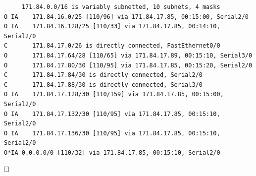 \documentclass[11pt]{article}
\begin{document}
\begin{enumerate}
\begin{mdframed}
\begin{verbatim}
     171.84.0.0/16 is variably subnetted, 10 subnets, 4 masks
O IA    171.84.16.0/25 [110/96] via 171.84.17.85, 00:15:00, Serial2/0
O IA    171.84.16.128/25 [110/33] via 171.84.17.85, 00:14:10, Serial2/0
C       171.84.17.0/26 is directly connected, FastEthernet0/0
O       171.84.17.64/28 [110/65] via 171.84.17.89, 00:15:10, Serial3/0
O       171.84.17.80/30 [110/95] via 171.84.17.85, 00:15:20, Serial2/0
C       171.84.17.84/30 is directly connected, Serial2/0
C       171.84.17.88/30 is directly connected, Serial3/0
O IA    171.84.17.128/30 [110/159] via 171.84.17.85, 00:15:00, Serial2/0
O IA    171.84.17.132/30 [110/95] via 171.84.17.85, 00:15:10, Serial2/0
O IA    171.84.17.136/30 [110/95] via 171.84.17.85, 00:15:10, Serial2/0
O*IA 0.0.0.0/0 [110/32] via 171.84.17.85, 00:15:10, Serial2/0
\end{verbatim}
\end{mdframed}

    $\hfill\square$
\end{enumerate}
\end{document}

